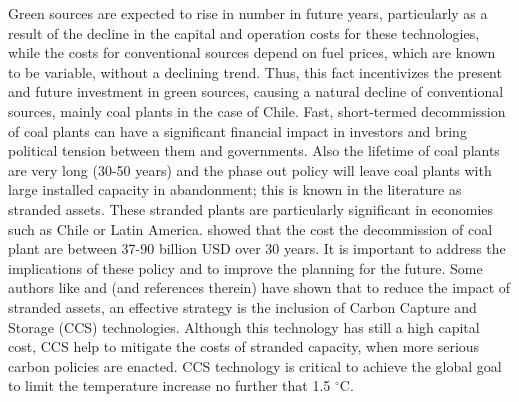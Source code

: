 \documentclass[11pt, letterpaper]{article}
\begin{document}
Green sources are expected to rise in number in future years, particularly as a result of the decline in the capital and operation costs for these technologies, while the costs for conventional sources depend on fuel prices, which are known to be variable, without a declining trend. Thus, this fact incentivizes the present and future investment in green sources, causing a natural decline of conventional sources, mainly coal plants in the case of Chile. Fast, short-termed decommission of coal plants can have a significant financial impact in investors and bring political tension between them and governments. Also the lifetime of coal plants are very long (30-50 years) and the phase out policy will leave coal plants with large installed capacity in abandonment; this is known in the literature as stranded assets. These stranded plants are particularly significant in economies such as Chile or Latin America. \cite{feijoo2019Stranded} showed that the cost the decommission of coal plant are between 37-90 billion USD over 30 years. It is important to address the implications of these policy and to improve the planning for the future. Some authors like \cite{Johnson2015} and \cite{Clark2014} (and references therein) have shown that to reduce the impact of stranded assets, an effective strategy is the inclusion of Carbon Capture and Storage (CCS) technologies. Although this technology has still a high capital cost, CCS help to mitigate the costs of stranded capacity, when more serious carbon policies are enacted. CCS technology is critical to achieve the global goal to limit the temperature increase no further that 1.5 $^{\circ}$C.

\newpage


\end{document}
